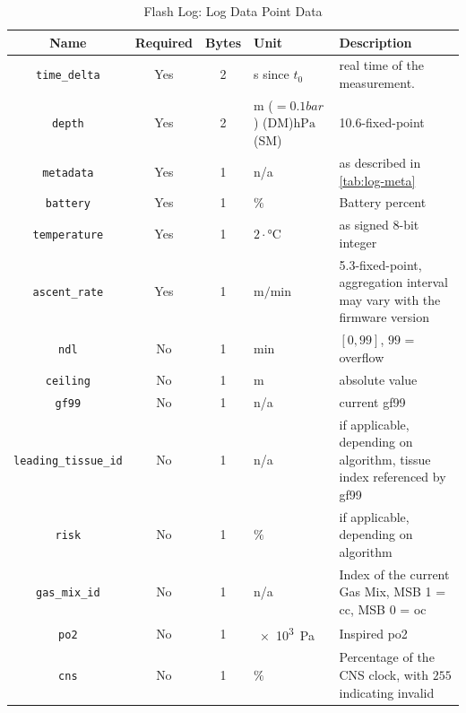 \begin{table}[htbp]
  \centering
  \label{tab:log-data}
  \begin{tabularx}{\textwidth}{|c|c|c|p{3.2cm}|X|}
    \hline
    Name & Required & Bytes & Unit & Description \\
    \hline
    \lstinline{time_delta} & Yes & 2 & \si{\second} since $t_0$ & real time of the measurement. \\
    \hline
    \lstinline{depth} & Yes & 2 & $\si{\meter}$ ($=0.1\si{bar}$) (DM)\newline $\si{\hecto\Pa}$ (SM) & 10.6-fixed-point \\
    \hline
    \lstinline{metadata} & Yes & 1 & n/a & as described in \ref{tab:log-meta} \\
    \hline
    \lstinline{battery} & Yes & 1 & $\%$ & Battery percent \\
    \hline
    \lstinline{temperature} & Yes & 1 & $2 \cdot \si{\celsius}$ & as signed 8-bit integer \\
    \hline
    \lstinline{ascent_rate} & Yes & 1 & $\si{\meter/\minute}$ & 5.3-fixed-point, aggregation interval may vary with the firmware version \\
    \hline
    \lstinline{ndl} & No & 1 & \si{\minute} & $[0,99]$, $99$ = overflow \\
    \hline
    \lstinline{ceiling} & No & 1 & \si{\meter} & absolute value \\
    \hline
    \lstinline{gf99} & No & 1 & n/a & current \gls{gf99} \\
    \hline
    \lstinline{leading_tissue_id} & No & 1 & n/a & if applicable, depending on algorithm, tissue index referenced by \gls{gf99} \\
    \hline 
    \lstinline{risk} & No & 1 & $\%$ & if applicable, depending on algorithm \\
    \hline
    \lstinline{gas_mix_id} & No & 1 & n/a & Index of the current Gas Mix, MSB 1 = \gls{cc}, MSB 0 = \gls{oc} \\
    \hline
    \lstinline{po2} & No & 1 & \SI{e3}{\Pa} & Inspired \gls{po2} \\
    \hline
    \lstinline{cns} & No & 1 & $\%$ & Percentage of the CNS clock, with $255$ indicating invalid \\
    \hline
  \end{tabularx}
  \caption{Flash Log: Log Data Point Data}
\end{table}
